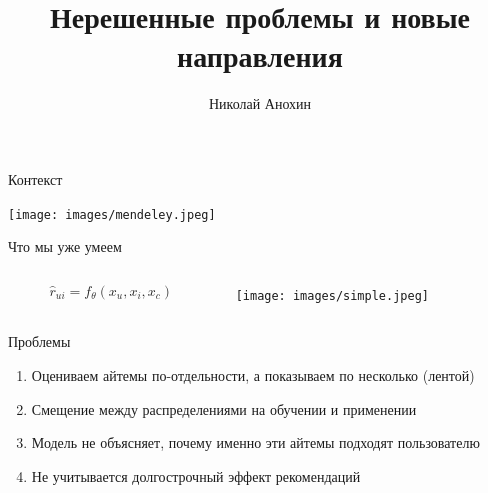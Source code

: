 \documentclass[11pt,aspectratio=169,handout]{beamer}
\author{Николай Анохин}
\title{Нерешенные проблемы и новые направления}
\begin{document}
{

\begin{frame}
\titlepage
\end{frame}


}

\begin{frame}{Контекст}

\begin{center}
\texttt{[image: images/mendeley.jpeg]}
\end{center}

\end{frame}

\begin{frame}{Что мы уже умеем}

\begin{columns}

\begin{column}{0.55\textwidth}
\begin{center}
\begin{tcolorbox}[colback=info!5,colframe=info!80,title=]
\begin{large}
\[
\hat r_{ui} = f_{\theta}(x_u, x_i, x_c)
\]
\end{large}
\end{tcolorbox}\end{center}
\end{column}

\begin{column}{0.35\textwidth} 
\begin{center}
\texttt{[image: images/simple.jpeg]}
\end{center}
\end{column}
\end{columns}

\vfill

Проблемы
\begin{enumerate}[<+->]
\item Оцениваем айтемы по-отдельности, а показываем по несколько (лентой)
\item Смещение между распределениями на обучении и применении
\item Модель не объясняет, почему именно эти айтемы подходят пользователю
\item {\color{blue} Не учитывается долгострочный эффект рекомендаций}
\end{enumerate}

\end{frame}
\end{document}
